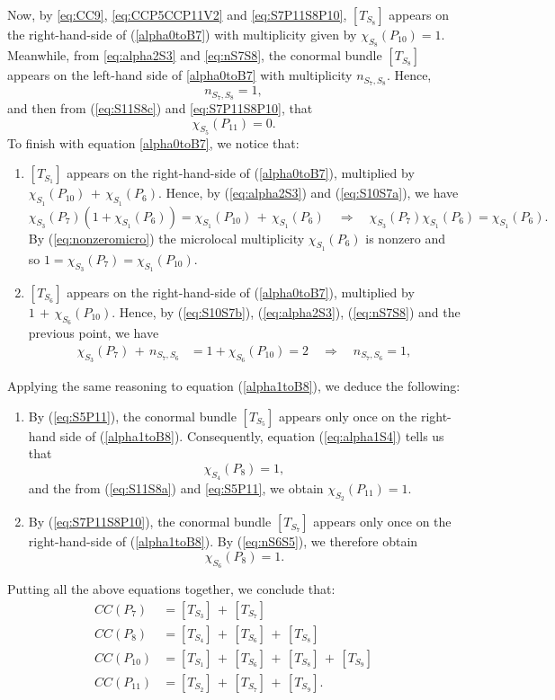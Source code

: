 \documentclass[a4paper, 11pt]{article}
\begin{document}
Now, by \eqref{eq:CC9}, \eqref{eq:CCP5CCP11V2} and
\eqref{eq:S7P11S8P10}, $[T_{S_8}]$ appears 
on the right-hand-side of (\ref{alpha0toB7}) with
multiplicity given by $\chi^{}_{S_8}(P_{10})=1$. Meanwhile, from
\eqref{eq:alpha2S3} and \eqref{eq:nS7S8}, the conormal bundle $[T_{S_8}]$
appears on the left-hand side of \eqref{alpha0toB7} with multiplicity  
\(n_{S_7,S_8}\). Hence,
$$
n_{S_7,S_8}=1,
$$
and then from  (\ref{eq:S11S8c}) and \eqref{eq:S7P11S8P10}, that
\begin{equation} \label{eq:S5P11}
\chi_{S_5}^{}(P_{11})=0.
\end{equation}
To finish with equation  \eqref{alpha0toB7}, we notice that:
\begin{enumerate}
\item $[T_{S_1}]$ appears on the right-hand-side of
  (\ref{alpha0toB7}), multiplied by $\chi_{S_1}^{}(P_{10})\, +\,
  {\chi_{S_1}^{}(P_{6})}$. Hence, by (\ref{eq:alpha2S3}) and 
  (\ref{eq:S10S7a}), we have 
$$
\chi^{}_{S_3}(P_7)(1+\chi^{}_{S_1}(P_6))
=\chi_{S_1}^{}(P_{10})\, +\, {\chi_{S_1}^{}(P_{6})}\quad\Longrightarrow\quad
\chi^{}_{S_3}(P_7)\chi^{}_{S_1}(P_6)
=\chi_{S_1}^{}(P_{6}).$$  
By (\ref{eq:nonzeromicro}) the microlocal multiplicity
$\chi^{}_{S_1}(P_6)$ is nonzero and so
$1 =\chi_{S_3}^{}(P_{7})=\chi_{S_1}^{}(P_{10})$. 
\item $[T_{S_6}]$ appears on the right-hand-side of
  (\ref{alpha0toB7}), multiplied by $1\, +\,
  {\chi_{S_6}^{}(P_{10})}$. Hence, by (\ref{eq:S10S7b}),  
(\ref{eq:alpha2S3}), (\ref{eq:nS7S8}) and the previous point, we have
\begin{align*} 
\chi^{}_{S_3}(P_7)\, +\, n_{S_7,S_6}&=1+\chi_{S_6}^{}(P_{10})=2
\quad\Longrightarrow\quad n_{S_7,S_6}=1,
\end{align*}
\end{enumerate}
Applying the same reasoning to equation (\ref{alpha1toB8}), we deduce
the following: 
\begin{enumerate}
\item By  (\ref{eq:S5P11}), the conormal bundle $[T_{S_5}]$ appears
  only once on the right-hand side of
  (\ref{alpha1toB8}). Consequently, equation (\ref{eq:alpha1S4}) tells
  us that
$$\chi^{}_{S_4}(P_8)=1,$$
and the from  (\ref{eq:S11S8a}) and \eqref{eq:S5P11}, we obtain
$\chi^{}_{S_2}(P_{11})=1.$ 
\item By (\ref{eq:S7P11S8P10}), the conormal bundle $[T_{S_7}]$
  appears only once on  the right-hand-side of (\ref{alpha1toB8}).
By  (\ref{eq:nS6S5}), we therefore obtain
$$\chi_{S_6}(P_8)=1.$$
\end{enumerate}
Putting all the above equations together, we conclude that:
\begin{align*}
CC(P_{7})&= [T_{S_3}]\, +\, 
[T_{S_7}]\\
CC(P_8)&= [T_{S_4}]\, +\, 
[T_{S_6}]\, +\, [T_{S_8}]\\
CC(P_{10})&=[T_{S_1}]\, +\, 
[T_{S_6}]\, +\, 
[T_{S_8}]\, +\, [T_{S_9}]\\
CC(P_{11})&=[T_{S_2}]\, +\, [T_{S_7}]\, +\, [T_{S_9}].
\end{align*}
\end{document}

